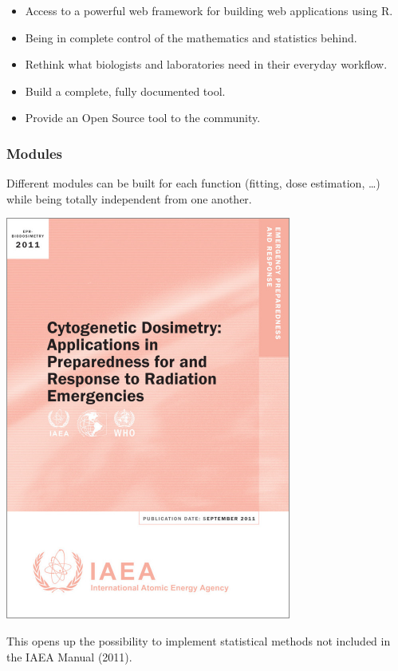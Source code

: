 \documentclass[]{scrartcl}
\begin{document}
\begin{itemize}
\item
  Access to a powerful web framework for building web applications using R.
\item
  Being in complete control of the mathematics and statistics behind.
\item
  Rethink what biologists and laboratories need in their everyday workflow.
\item
  Build a complete, fully documented tool.
\item
  Provide an Open Source tool to the community.
\end{itemize}

\hypertarget{modules}{%
\subsubsection*{Modules}\label{modules}}

Different modules can be built for each function (fitting, dose estimation, \ldots) while being totally independent from one another.

\begin{center}\includegraphics[width=355px]{images/stats/iaea-cover} \end{center}

This opens up the possibility to implement statistical methods not included in the IAEA Manual (2011).
\end{document}
